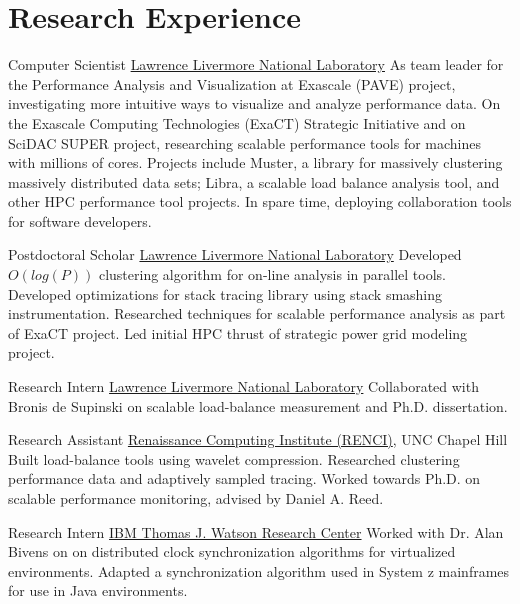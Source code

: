 \section{Research Experience}
		{Computer Scientist}
		{\href{http://www.llnl.gov}{Lawrence Livermore National Laboratory}}{}{}
		{As team leader for the Performance Analysis and Visualization at Exascale (PAVE) project,
		 investigating more intuitive ways to visualize and analyze performance data.
		 On the Exascale Computing Technologies (ExaCT) Strategic Initiative and on SciDAC SUPER project, researching
		 scalable performance tools for machines with millions of cores.  Projects include Muster, a library for
		 massively clustering massively distributed data sets; Libra, a scalable load balance analysis tool, and
		 other HPC performance tool projects.  In spare time, deploying collaboration tools for software developers.}

		{Postdoctoral Scholar}
		{\href{http://www.llnl.gov}{Lawrence Livermore National Laboratory}}{}{}
		{Developed $O(log(P))$ clustering algorithm for on-line analysis in parallel tools.
		 Developed optimizations for stack tracing library using stack smashing instrumentation.  Researched techniques for
		 scalable performance analysis as part of ExaCT project.  Led initial HPC thrust
		 of strategic power grid modeling project.}

		{Research Intern}
		{\href{http://www.llnl.gov}{Lawrence Livermore National Laboratory}}{}{}
		{Collaborated with Bronis de Supinski on scalable load-balance measurement and Ph.D. dissertation.}

		{Research Assistant}
		{\href{http://www.renci.org}{Renaissance Computing Institute (RENCI)}, UNC Chapel Hill}{}{}
		{Built load-balance tools using wavelet compression.  Researched clustering performance data and adaptively sampled tracing.  Worked towards Ph.D. on scalable performance monitoring, advised by Daniel A. Reed.}

		{Research Intern}
		{\href{http://www.watson.ibm.com}{IBM Thomas J. Watson Research Center}}{}{}
		{Worked with Dr. Alan Bivens on on distributed clock synchronization algorithms for virtualized environments.  Adapted a synchronization algorithm used in System z mainframes for use in Java environments.}

